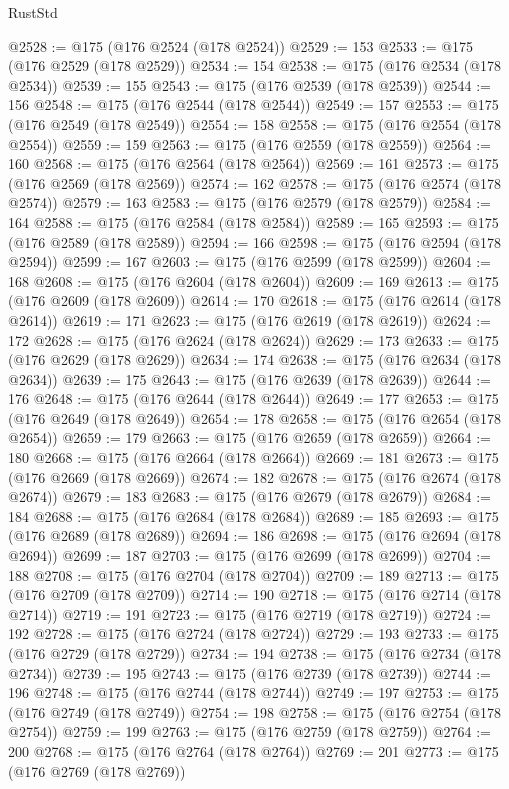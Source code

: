 \begin{lexlean}{RustStd}
\begin{coremodule}
@2528 := @175 (@176 @2524 (@178 @2524))
@2529 := 153
@2533 := @175 (@176 @2529 (@178 @2529))
@2534 := 154
@2538 := @175 (@176 @2534 (@178 @2534))
@2539 := 155
@2543 := @175 (@176 @2539 (@178 @2539))
@2544 := 156
@2548 := @175 (@176 @2544 (@178 @2544))
@2549 := 157
@2553 := @175 (@176 @2549 (@178 @2549))
@2554 := 158
@2558 := @175 (@176 @2554 (@178 @2554))
@2559 := 159
@2563 := @175 (@176 @2559 (@178 @2559))
@2564 := 160
@2568 := @175 (@176 @2564 (@178 @2564))
@2569 := 161
@2573 := @175 (@176 @2569 (@178 @2569))
@2574 := 162
@2578 := @175 (@176 @2574 (@178 @2574))
@2579 := 163
@2583 := @175 (@176 @2579 (@178 @2579))
@2584 := 164
@2588 := @175 (@176 @2584 (@178 @2584))
@2589 := 165
@2593 := @175 (@176 @2589 (@178 @2589))
@2594 := 166
@2598 := @175 (@176 @2594 (@178 @2594))
@2599 := 167
@2603 := @175 (@176 @2599 (@178 @2599))
@2604 := 168
@2608 := @175 (@176 @2604 (@178 @2604))
@2609 := 169
@2613 := @175 (@176 @2609 (@178 @2609))
@2614 := 170
@2618 := @175 (@176 @2614 (@178 @2614))
@2619 := 171
@2623 := @175 (@176 @2619 (@178 @2619))
@2624 := 172
@2628 := @175 (@176 @2624 (@178 @2624))
@2629 := 173
@2633 := @175 (@176 @2629 (@178 @2629))
@2634 := 174
@2638 := @175 (@176 @2634 (@178 @2634))
@2639 := 175
@2643 := @175 (@176 @2639 (@178 @2639))
@2644 := 176
@2648 := @175 (@176 @2644 (@178 @2644))
@2649 := 177
@2653 := @175 (@176 @2649 (@178 @2649))
@2654 := 178
@2658 := @175 (@176 @2654 (@178 @2654))
@2659 := 179
@2663 := @175 (@176 @2659 (@178 @2659))
@2664 := 180
@2668 := @175 (@176 @2664 (@178 @2664))
@2669 := 181
@2673 := @175 (@176 @2669 (@178 @2669))
@2674 := 182
@2678 := @175 (@176 @2674 (@178 @2674))
@2679 := 183
@2683 := @175 (@176 @2679 (@178 @2679))
@2684 := 184
@2688 := @175 (@176 @2684 (@178 @2684))
@2689 := 185
@2693 := @175 (@176 @2689 (@178 @2689))
@2694 := 186
@2698 := @175 (@176 @2694 (@178 @2694))
@2699 := 187
@2703 := @175 (@176 @2699 (@178 @2699))
@2704 := 188
@2708 := @175 (@176 @2704 (@178 @2704))
@2709 := 189
@2713 := @175 (@176 @2709 (@178 @2709))
@2714 := 190
@2718 := @175 (@176 @2714 (@178 @2714))
@2719 := 191
@2723 := @175 (@176 @2719 (@178 @2719))
@2724 := 192
@2728 := @175 (@176 @2724 (@178 @2724))
@2729 := 193
@2733 := @175 (@176 @2729 (@178 @2729))
@2734 := 194
@2738 := @175 (@176 @2734 (@178 @2734))
@2739 := 195
@2743 := @175 (@176 @2739 (@178 @2739))
@2744 := 196
@2748 := @175 (@176 @2744 (@178 @2744))
@2749 := 197
@2753 := @175 (@176 @2749 (@178 @2749))
@2754 := 198
@2758 := @175 (@176 @2754 (@178 @2754))
@2759 := 199
@2763 := @175 (@176 @2759 (@178 @2759))
@2764 := 200
@2768 := @175 (@176 @2764 (@178 @2764))
@2769 := 201
@2773 := @175 (@176 @2769 (@178 @2769))

\end{coremodule}
\end{lexlean}
